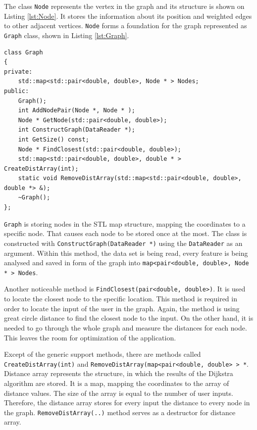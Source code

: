 \documentclass[thesis=M,english]{FITthesis}[2012/10/20]
\begin{document}
The class \texttt{Node} represents the vertex in the graph and its structure is shown on Listing \ref{lst:Node}. It stores the information about its position and weighted edges to other adjacent vertices. \texttt{Node} forms a foundation for the graph represented as \texttt{Graph} class, shown in Listing \ref{lst:Graph}.

\begin{lstlisting}[frame=single, caption={\texttt{Graph} class}, label={lst:Graph}, breaklines=true]
class Graph
{
private:
    std::map<std::pair<double, double>, Node * > Nodes;
public:
    Graph();
    int AddNodePair(Node *, Node * );
    Node * GetNode(std::pair<double, double>);
    int ConstructGraph(DataReader *);
    int GetSize() const;
    Node * FindClosest(std::pair<double, double>);
    std::map<std::pair<double, double>, double * > CreateDistArray(int);
    static void RemoveDistArray(std::map<std::pair<double, double>, double *> &);
    ~Graph();
};
\end{lstlisting}

\texttt{Graph} is storing nodes in the STL map structure, mapping the coordinates to a specific node. That causes each node to be stored once at the most. The class is constructed with \texttt{ConstructGraph(DataReader *)} using the \texttt{DataReader} as an argument. Within this method, the data set is being read, every feature is being analysed and saved in form of the graph into \texttt{map<pair<double, double>, Node * > Nodes}.

Another noticeable method is \texttt{FindClosest(pair<double, double>)}. It is used to locate the closest node to the specific location. This method is required in order to locate the input of the user in the graph. Again, the method is using great circle distance to find the closest node to the input. 
On the other hand, it is needed to go through the whole graph and measure the distances for each node. 
This leaves the room for optimization of the application.

Except of the generic support methods, there are methods called \texttt{CreateDistArray(int)} and \texttt{RemoveDistArray(map<pair<double, double> > *}. Distance array represents the structure, in which the results of the Dijkstra algorithm are stored. It is a map, mapping the coordinates to the array of distance values. The size of the array is equal to the number of user inputs. Therefore, the distance array stores for every input the distance to every node in the graph. 
\texttt{RemoveDistArray(..)} method serves as a destructor for distance array.
\end{document}

